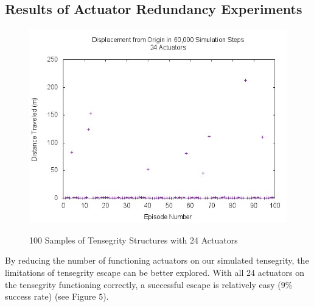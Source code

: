 \documentclass{llncs}
\begin{document}
\subsection{Results of Actuator Redundancy Experiments}
\label{robust24} {
\begin{figure}
\label{robust24scatter}
\centering
{\includegraphics[width=1\linewidth]{Pictures/dists100.jpg}} 
\caption{100 Samples of Tensegrity Structures with 24 Actuators}
\end{figure}

By reducing the number of functioning actuators on our simulated tensegrity, the limitations of tensegrity escape can be better explored.
With all 24 actuators on the tensegrity functioning correctly, a successful escape is relatively easy ($9\%$ success rate) (see Figure $5$).
} 
                       
\end{document}
